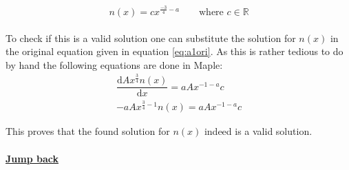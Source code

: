 \documentclass{article}
\numberwithin{equation}{section} %
\newcommand{\md}{\mathrm{d}}
\begin{document}
\begin{equation}\label{eq:a:nx}
	n(x) = cx^{\tfrac{-3}{4}-a} \qquad \textrm{where } c \in \mathbb{R}
\end{equation}\\
To check if this is a valid solution one can substitute the solution for $n(x)$ in the original equation given in equation \ref{eq:a1ori}. As this is rather tedious to do by hand the following equations are done in Maple:
\begin{align}
\dfrac{\md Ax^{\tfrac{3}{4}}n(x)}{\md x} = aAx^{-1-a}c\\
	-aAx^{\tfrac{3}{4}-1}n(x) = aAx^{-1-a}c
\end{align}

This proves that the found solution for $n(x)$ indeed is a valid solution.\\
\\
\textbf{\hyperref[jmp:a:calcEx1a]{Jump back }}

\newpage
\end{document}
